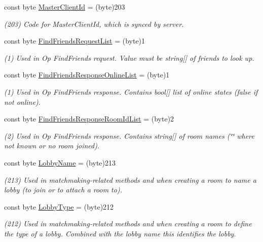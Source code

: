 \begin{DoxyCompactItemize}
const byte \hyperlink{class_exit_games_1_1_client_1_1_photon_1_1_parameter_code_a1f3cfe3d4e33a66a1b43f69b61c1371d}{Master\+Client\+Id} = (byte)203
\begin{DoxyCompactList}\small\item\em (203) Code for Master\+Client\+Id, which is synced by server. \end{DoxyCompactList}\item 
const byte \hyperlink{class_exit_games_1_1_client_1_1_photon_1_1_parameter_code_ab6913b8ff2c8f5ac9c63989399140e00}{Find\+Friends\+Request\+List} = (byte)1
\begin{DoxyCompactList}\small\item\em (1) Used in Op Find\+Friends request. Value must be string\mbox{[}\mbox{]} of friends to look up.\end{DoxyCompactList}\item 
const byte \hyperlink{class_exit_games_1_1_client_1_1_photon_1_1_parameter_code_af6846009bdef571db627b0944560166b}{Find\+Friends\+Response\+Online\+List} = (byte)1
\begin{DoxyCompactList}\small\item\em (1) Used in Op Find\+Friends response. Contains bool\mbox{[}\mbox{]} list of online states (false if not online).\end{DoxyCompactList}\item 
const byte \hyperlink{class_exit_games_1_1_client_1_1_photon_1_1_parameter_code_ac902f48f2bf554c848ddf4da57b8c828}{Find\+Friends\+Response\+Room\+Id\+List} = (byte)2
\begin{DoxyCompactList}\small\item\em (2) Used in Op Find\+Friends response. Contains string\mbox{[}\mbox{]} of room names (\char`\"{}\char`\"{} where not known or no room joined).\end{DoxyCompactList}\item 
const byte \hyperlink{class_exit_games_1_1_client_1_1_photon_1_1_parameter_code_a9fa51cb55e1c0c7d02e372d57279e639}{Lobby\+Name} = (byte)213
\begin{DoxyCompactList}\small\item\em (213) Used in matchmaking-\/related methods and when creating a room to name a lobby (to join or to attach a room to).\end{DoxyCompactList}\item 
const byte \hyperlink{class_exit_games_1_1_client_1_1_photon_1_1_parameter_code_a195d283fab30f59f8f0d3b9646ab3af4}{Lobby\+Type} = (byte)212
\begin{DoxyCompactList}\small\item\em (212) Used in matchmaking-\/related methods and when creating a room to define the type of a lobby. Combined with the lobby name this identifies the lobby.\end{DoxyCompactList}\item 

\end{DoxyCompactItemize}
